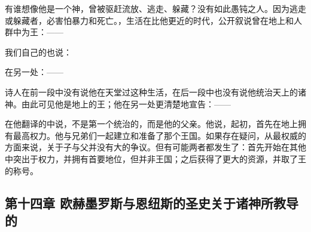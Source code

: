 有谁想像他是一个神，曾被驱赶流放、逃走、躲藏？没有如此愚钝之人。因为逃走或躲藏者，必害怕暴力和死亡。，生活在比他更近的时代，公开叙说曾在地上和人群中为王：——\par

\par

我们自己的也说：\par

\par

在另一处：——\par

\par

诗人在前一段中没有说他在天堂过这种生活，在后一段中也没有说他统治天上的诸神。由此可见他是地上的王；他在另一处更清楚地宣告：——\par

\par

在他翻译的中说，不是第一个统治的，而是他的父亲。他说，起初，首先在地上拥有最高权力。他与兄弟们一起建立和准备了那个王国。如果存在疑问，从最权威的方面来说，关于子与父并没有大的争议。但有可能两者都发生了：首先开始在其他中突出于权力，并拥有首要地位，但并非王国；之后获得了更大的资源，并取了王的称号。\par


\subsection{第十四章  欧赫墨罗斯与恩纽斯的圣史关于诸神所教导的}

